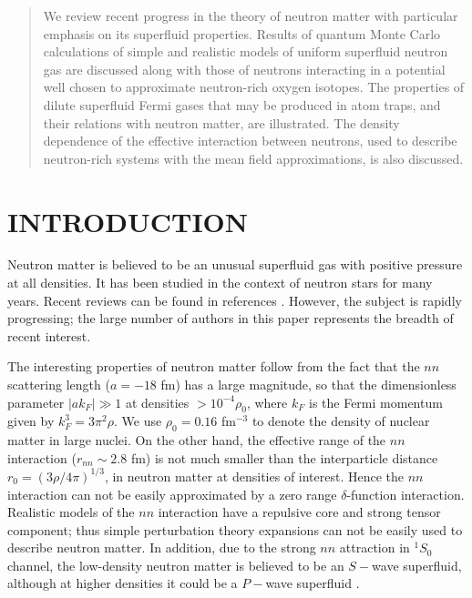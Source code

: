 \maketitle

\begin{abstract}
We review recent progress in the theory of neutron matter with particular 
emphasis on its superfluid properties.  Results of quantum Monte Carlo 
calculations of simple and realistic models of uniform superfluid neutron gas are 
discussed along with those of neutrons interacting in a potential well 
chosen to approximate neutron-rich oxygen isotopes. 
The properties of dilute superfluid Fermi gases that may be produced in atom 
traps, and their relations with neutron matter, are illustrated. 
The density dependence of the effective interaction between neutrons, 
used to describe neutron-rich systems with the mean field approximations, 
is also discussed. 
 

\end{abstract}

\section{INTRODUCTION}

Neutron matter is believed to be an 
unusual superfluid gas with positive pressure at all 
densities.  It has been studied in the context of neutron stars for many 
years.  Recent reviews can be found in references \cite{anr1,anr2,rmp1}. 
However, the subject is rapidly progressing; the large number of authors 
in this paper represents the breadth of recent interest.  

The interesting properties of neutron matter follow from the fact that 
the $nn$ scattering length ($a=-18$ fm) has a large magnitude, so that 
the dimensionless parameter $|ak_F|\gg 1$ at densities   
$ > 10^{-4}\rho_0$, where $k_F$ is the Fermi momentum 
given by $k_F^3=3 \pi^2 \rho$.  We use $\rho_0=0.16$ fm$^{-3}$ to denote the 
density of nuclear matter in large nuclei.  On the other hand, the effective 
range of the $nn$ interaction ($r_{nn} \sim 2.8$ fm) is not much smaller than 
the interparticle distance $r_0 = (3 \rho/4 \pi)^{1/3}$, 
in neutron matter at densities of interest.  
Hence the $nn$ interaction can not be easily approximated by a zero range 
$\delta$-function interaction.  Realistic models of the $nn$ 
interaction have a repulsive core and strong tensor component; thus 
simple perturbation theory expansions can not be easily used to describe 
neutron matter.  In addition, due to the strong $nn$ attraction in $^1S_0$ 
channel, the low-density neutron matter is believed to be an $S-$wave 
superfluid, although at higher densities it could be a $P-$wave superfluid 
\cite{rmp1}.  

